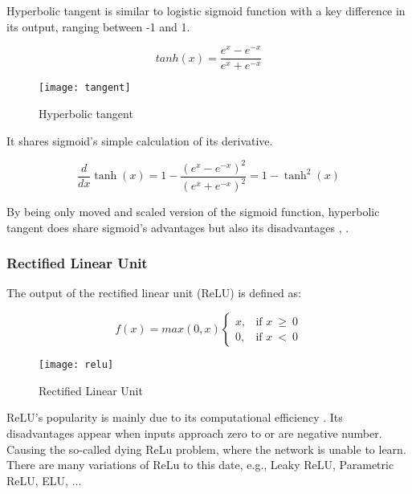 Hyperbolic tangent is similar to logistic sigmoid function with a key difference in its output, ranging between -1 and 1.

\begin{equation}
    {tanh(x) = \frac{e^x - e^{-x}}{e^x + e^{-x}}}
\end{equation}


\begin{figure}[h]
	\centering
    \texttt{[image: tangent]}
	\caption{Hyperbolic tangent \cite{matous}}
	\label{fig:hyperbolictangent}
\end{figure}


It shares sigmoid's simple calculation of its derivative.

\begin{equation}
    {\frac{d}{dx}\tanh(x) = 1 - \frac{(e^x - e^{-x})^2}{(e^x + e^{-x})^2} = 1 -\tanh^2(x)}
\end{equation}

By being only moved and scaled version of the sigmoid function, hyperbolic tangent does share sigmoid's advantages but also its disadvantages \cite{leskovec2020mining}, \cite{matous}.


\subsubsection{Rectified Linear Unit}

The output of the rectified linear unit (ReLU) is defined as:

\begin{equation}
    f(x) = max(0,x)
\begin{cases}
    x, & \text{if $x\ \geq\ 0$}\\
    0, & \text{if $x\ <\ 0$}
\end{cases} 
\end{equation} 

\begin{figure}[h]
	\centering
    \texttt{[image: relu]}
	\caption{Rectified Linear Unit \cite{matous}}
	\label{fig:relu}
\end{figure}


ReLU's popularity is mainly due to its computational efficiency \cite{7typesactivationfunctions}. Its disadvantages appear when inputs approach zero to or are negative number. Causing the so-called dying ReLu problem, where the network is unable to learn. There are many variations of ReLu to this date, e.g., Leaky ReLU, Parametric ReLU, ELU, ...

